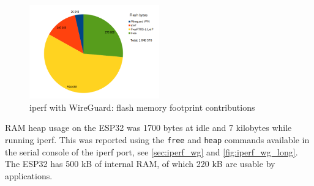 \begin{figure}[H]
    \centering
    \vspace{0.5cm}
    \includegraphics[width=0.5\textwidth, scale=0.25]{images/iperf_flash_footprint.png}
    \caption{iperf with WireGuard: flash memory footprint contributions}
    \label{fig:iperf_flash_piechart} %
\end{figure}

RAM heap usage on the ESP32 was 1700 bytes at idle and 7 kilobytes while running iperf. This was reported using the \texttt{free} and \texttt{heap} commands available in the serial console of the iperf port, see \ref{sec:iperf_wg} and \ref{fig:iperf_wg_long}.\\
The ESP32 has 500 kB of internal RAM, of which 220 kB are usable by applications.

